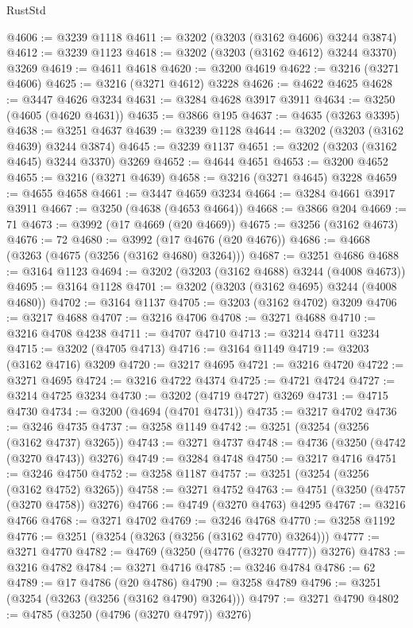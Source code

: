 \begin{lexlean}{RustStd}
\begin{coremodule}
@4606 := @3239 @1118
@4611 := @3202 (@3203 (@3162 @4606) @3244 @3874)
@4612 := @3239 @1123
@4618 := @3202 (@3203 (@3162 @4612) @3244 @3370) @3269
@4619 := @4611 @4618
@4620 := @3200 @4619
@4622 := @3216 (@3271 @4606)
@4625 := @3216 (@3271 @4612) @3228
@4626 := @4622 @4625
@4628 := @3447 @4626 @3234
@4631 := @3284 @4628 @3917 @3911
@4634 := @3250 (@4605 (@4620 @4631))
@4635 := @3866 @195
@4637 := @4635 (@3263 @3395)
@4638 := @3251 @4637
@4639 := @3239 @1128
@4644 := @3202 (@3203 (@3162 @4639) @3244 @3874)
@4645 := @3239 @1137
@4651 := @3202 (@3203 (@3162 @4645) @3244 @3370) @3269
@4652 := @4644 @4651
@4653 := @3200 @4652
@4655 := @3216 (@3271 @4639)
@4658 := @3216 (@3271 @4645) @3228
@4659 := @4655 @4658
@4661 := @3447 @4659 @3234
@4664 := @3284 @4661 @3917 @3911
@4667 := @3250 (@4638 (@4653 @4664))
@4668 := @3866 @204
@4669 := 71
@4673 := @3992 (@17 @4669 (@20 @4669))
@4675 := @3256 (@3162 @4673)
@4676 := 72
@4680 := @3992 (@17 @4676 (@20 @4676))
@4686 := @4668 (@3263 (@4675 (@3256 (@3162 @4680) @3264)))
@4687 := @3251 @4686
@4688 := @3164 @1123
@4694 := @3202 (@3203 (@3162 @4688) @3244 (@4008 @4673))
@4695 := @3164 @1128
@4701 := @3202 (@3203 (@3162 @4695) @3244 (@4008 @4680))
@4702 := @3164 @1137
@4705 := @3203 (@3162 @4702) @3209
@4706 := @3217 @4688
@4707 := @3216 @4706
@4708 := @3271 @4688
@4710 := @3216 @4708 @4238
@4711 := @4707 @4710
@4713 := @3214 @4711 @3234
@4715 := @3202 (@4705 @4713)
@4716 := @3164 @1149
@4719 := @3203 (@3162 @4716) @3209
@4720 := @3217 @4695
@4721 := @3216 @4720
@4722 := @3271 @4695
@4724 := @3216 @4722 @4374
@4725 := @4721 @4724
@4727 := @3214 @4725 @3234
@4730 := @3202 (@4719 @4727) @3269
@4731 := @4715 @4730
@4734 := @3200 (@4694 (@4701 @4731))
@4735 := @3217 @4702
@4736 := @3246 @4735
@4737 := @3258 @1149
@4742 := @3251 (@3254 (@3256 (@3162 @4737) @3265))
@4743 := @3271 @4737
@4748 := @4736 (@3250 (@4742 (@3270 @4743)) @3276)
@4749 := @3284 @4748
@4750 := @3217 @4716
@4751 := @3246 @4750
@4752 := @3258 @1187
@4757 := @3251 (@3254 (@3256 (@3162 @4752) @3265))
@4758 := @3271 @4752
@4763 := @4751 (@3250 (@4757 (@3270 @4758)) @3276)
@4766 := @4749 (@3270 @4763) @4295
@4767 := @3216 @4766
@4768 := @3271 @4702
@4769 := @3246 @4768
@4770 := @3258 @1192
@4776 := @3251 (@3254 (@3263 (@3256 (@3162 @4770) @3264)))
@4777 := @3271 @4770
@4782 := @4769 (@3250 (@4776 (@3270 @4777)) @3276)
@4783 := @3216 @4782
@4784 := @3271 @4716
@4785 := @3246 @4784
@4786 := 62
@4789 := @17 @4786 (@20 @4786)
@4790 := @3258 @4789
@4796 := @3251 (@3254 (@3263 (@3256 (@3162 @4790) @3264)))
@4797 := @3271 @4790
@4802 := @4785 (@3250 (@4796 (@3270 @4797)) @3276)

\end{coremodule}
\end{lexlean}
